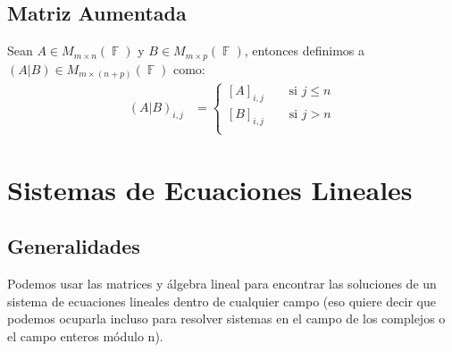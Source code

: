 \documentclass[12pt, fleqn]{report}                             %
\DeclareMathOperator \Space     {\quad}                         %
\theoremstyle{break}                                            %
\DeclareMathOperator \GenericField {\mathbb{F}}                 %
\begin{document}
        \clearpage
        \section{Matriz Aumentada}

            Sean $A \in M_{m \times n}(\GenericField)$ y 
            $B \in M_{m \times p}(\GenericField)$, entonces
            definimos a $(A | B) \in M_{m \times (n + p)}(\GenericField)$
            como:
            \begin{align*}
                (A | B)_{i, j}
                    &= 
                    \begin{cases}
                        [A]_{i, j} \Space \text{ si } j \leq n        \\
                        [B]_{i, j} \Space \text{ si } j > n           \\
                    \end{cases}
            \end{align*}




    \chapter{Sistemas de Ecuaciones Lineales}
        \clearpage


        \section{Generalidades}

            Podemos usar las matrices y álgebra lineal para encontrar las soluciones
            de un sistema de ecuaciones lineales dentro de cualquier campo (eso quiere
            decir que podemos ocuparla incluso para resolver sistemas en el campo de
            los complejos o el campo enteros módulo n).

\end{document}
